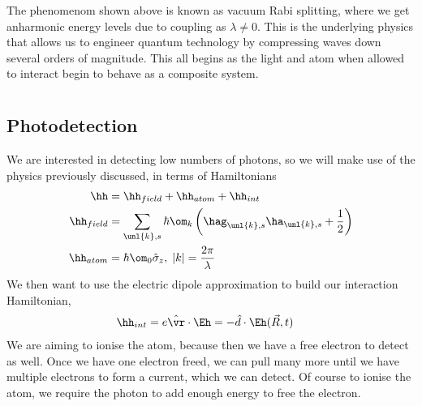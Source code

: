 \documentclass[a4paper, 11pt, normalem]{report}
\newcommand\hsig{\hat{\sigma}}
\begin{document}
\begin{figure}[H]
    \centering
\end{figure}
The phenomenom shown above is known as vacuum Rabi splitting, where we get anharmonic energy levels due to coupling as $\lambda\neq0$.
This is the underlying physics that allows us to engineer quantum technology by compressing waves down several orders of magnitude.
This all begins as the light and atom when allowed to interact begin to behave as a composite system.

\chapter{}
\section{Photodetection}
We are interested in detecting low numbers of photons, so we will make use of the physics previously discussed, in terms of Hamiltonians
\begin{align}
    \hh &= \hh_{field} + \hh_{atom} + \hh_{int} \\
    \hh_{field} &= \sum_{\unl{k},s}\hbar\om_k\left(\hag_{\unl{k},s}\ha_{\unl{k},s}+\frac12\right) \\
    \hh_{atom} &= \hbar\om_0\hsig_z,\; |k| = \frac{2\pi}{\lambda} \\
\end{align}
We then want to use the electric dipole approximation to build our interaction Hamiltonian,
\begin{align}
    \hh_{int} &= e\hat{\vr}\cdot\Eh = -\hat{d}\cdot\Eh(\vec{R},t)
\end{align}
We are aiming to ionise the atom, because then we have a free electron to detect as well. 
Once we have one electron freed, we can pull many more until we have multiple electrons to form a current, which we can detect.
Of course to ionise the atom, we require the photon to add enough energy to free the electron.
\end{document}
